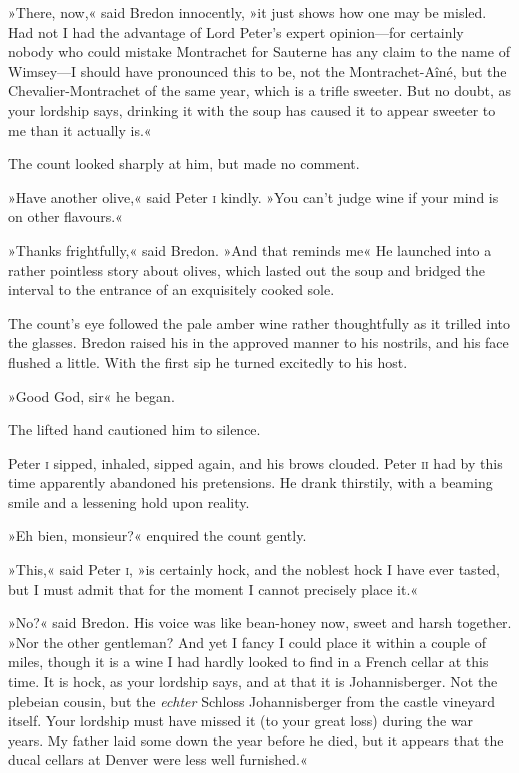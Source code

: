 »There, now,« said Bredon innocently, »it just shows how one may be misled. Had not I had the advantage of Lord Peter's expert opinion—for certainly nobody who could mistake Montrachet for Sauterne has any claim to the name of Wimsey—I should have pronounced this to be, not the Montrachet-Aîné, but the Chevalier-Montrachet of the same year, which is a trifle sweeter. But no doubt, as your lordship says, drinking it with the soup has caused it to appear sweeter to me than it actually is.«

The count looked sharply at him, but made no comment.

»Have another olive,« said Peter \textsc{i} kindly. »You can't judge wine if your mind is on other flavours.«

»Thanks frightfully,« said Bredon. »And that reminds me\longdash« He launched into a rather pointless story about olives, which lasted out the soup and bridged the interval to the entrance of an exquisitely cooked sole.

The count's eye followed the pale amber wine rather thoughtfully as it trilled into the glasses. Bredon raised his in the approved manner to his nostrils, and his face flushed a little. With the first sip he turned excitedly to his host.

»Good God, sir\longdash« he began.

The lifted hand cautioned him to silence.

Peter \textsc{i} sipped, inhaled, sipped again, and his brows clouded. Peter \textsc{ii} had by this time apparently abandoned his pretensions. He drank thirstily, with a beaming smile and a lessening hold upon reality.

»Eh bien, monsieur?« enquired the count gently.

»This,« said Peter \textsc{i}, »is certainly hock, and the noblest hock I have ever tasted, but I must admit that for the moment I cannot precisely place it.«

»No?« said Bredon. His voice was like bean-honey now, sweet and harsh together. »Nor the other gentleman? And yet I fancy I could place it within a couple of miles, though it is a wine I had hardly looked to find in a French cellar at this time. It is hock, as your lordship says, and at that it is Johannisberger. Not the plebeian cousin, but the \textit{echter} Schloss Johannisberger from the castle vineyard itself. Your lordship must have missed it (to your great loss) during the war years. My father laid some down the year before he died, but it appears that the ducal cellars at Denver were less well furnished.«

